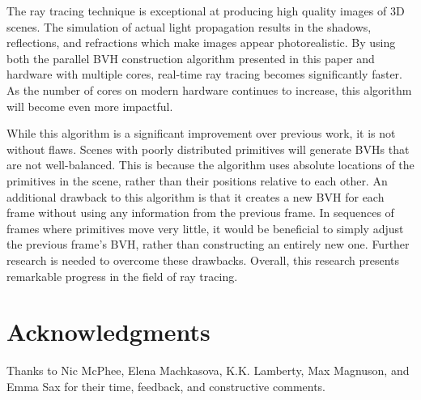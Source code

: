 \documentclass{sig-alternate}
\begin{document}
The ray tracing technique is exceptional at producing high quality images of 3D scenes. The simulation of actual light propagation results in the shadows, reflections, and refractions which make images appear photorealistic. By using both the parallel BVH construction algorithm presented in this paper and hardware with multiple cores, real-time ray tracing becomes significantly faster. As the number of cores on modern hardware continues to increase, this algorithm will become even more impactful.

While this algorithm is a significant improvement over previous work, it is not without flaws. Scenes with poorly distributed primitives will generate BVHs that are not well-balanced. This is because the algorithm uses absolute locations of the primitives in the scene, rather than their positions relative to each other. An additional drawback to this algorithm is that it creates a new BVH for each frame without using any information from the previous frame. In sequences of frames where primitives move very little, it would be beneficial to simply adjust the previous frame's BVH, rather than constructing an entirely new one. Further research is needed to overcome these drawbacks. Overall, this research presents remarkable progress in the field of ray tracing.


\section*{Acknowledgments}
\label{sec:acknowledgments}

Thanks to Nic McPhee, Elena Machkasova, K.K. Lamberty, Max Magnuson, and Emma Sax for their time, feedback, and constructive comments.



\end{document}
